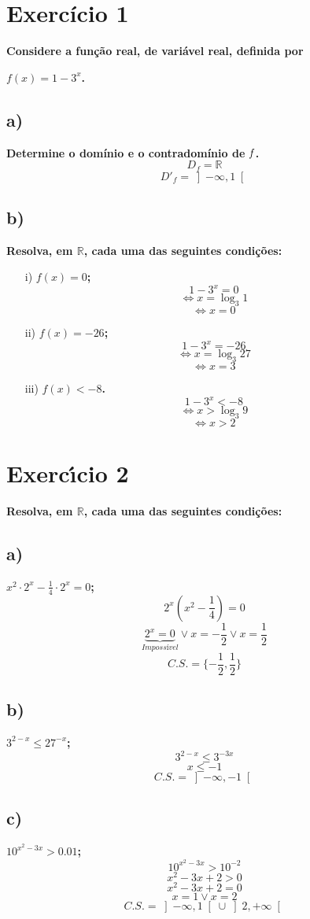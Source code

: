 \documentclass[a4paper]{article}
\begin{document}
	\section*{Exercício 1}\textbf{Considere a função real, de variável real, definida por}
	
	\begin{center}
		\textbf{$f(x) = 1 - 3^x$.}
	\end{center}
	\subsection*{a)}\textbf{Determine o domínio e o contradomínio de $\it{f}$.}
	\[D_{f}=\mathbb{R}\]
	\[D'_{f}= \left]-\infty,1\right[\]
	\subsection*{b)}\textbf{Resolva, em $\mathbb{R}$, cada uma das seguintes condições:}
	\begin{itemize}
		\item[i)] \textbf{$f(x)=0$;}
		\[1-3^x=0\]
		\[\Leftrightarrow x=\log_{3}{1}\]
		\[\Leftrightarrow x=0\]
		\item[ii)] \textbf{$f(x)=-26$;}
		\[1-3^x=-26\]
		\[\Leftrightarrow x=\log_{3}{27}\]
		\[\Leftrightarrow x=3\]
		\item[iii)] \textbf{$f(x)<-8$.}
		\[1-3^x<-8\]
		\[\Leftrightarrow x>\log_{3}{9}\]
		\[\Leftrightarrow x>2\]
	\end{itemize}
	\section*{Exercı́cio 2}\textbf{Resolva, em $\mathbb{R}$, cada uma das seguintes condições:}
	
	\subsection*{a)} \textbf{$x^2 \cdot 2^x - \frac{1}{4} \cdot 2^x =0$;}
	\[2^x\left(x^2-\frac{1}{4}\right)=0\]
	\[\underbrace{2^x=0}_{Impossível} \lor x=-\frac{1}{2} \lor x=\frac{1}{2}\]
	\[C.S.=\{-\frac{1}{2},\frac{1}{2}\}\]
	\subsection*{b)} \textbf{$3^{2-x} \leq 27^{-x}$;}
	\[3^{2-x} \leq 3^{-3x}\]
	\[x \leq -1\]
	\[C.S.=\left]-\infty,-1\right[\]
	
\subsection*{c)} \textbf{$10^{x^2-3x} > 0.01$;}
\[10^{x^2-3x} > 10^{-2}\]
\[x^2-3x + 2 > 0\]
\[x^2-3x + 2=0\]
\[x =1 \lor x=2\]
\[C.S.=\left]-\infty,1\right[\cup\left]2,+\infty\right[\]
\end{document}
